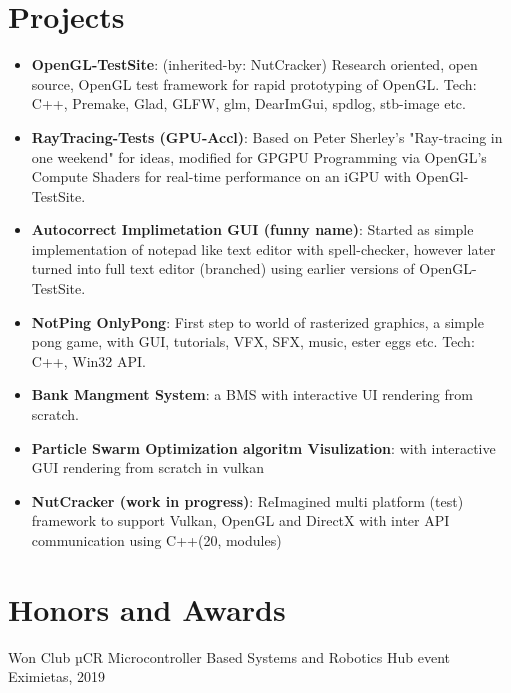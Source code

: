 \documentclass[a4paper,10pt]{article}
\newcommand{\resumeItem}[2]{
  \item\small{
    \textbf{#1}{: #2 \vspace{-2pt}}
  }
}
\newcommand{\resumeSubItem}[2]{\resumeItem{#1}{#2}\vspace{-3pt}}
\newcommand{\resumeSubHeadingListStart}{\begin{itemize}[leftmargin=*]}
\newcommand{\resumeSubHeadingListEnd}{\end{itemize}}
\begin{document}
\section{Projects}
  \resumeSubHeadingListStart
    \resumeSubItem{OpenGL-TestSite}{(inherited-by: NutCracker) Research oriented, open source, OpenGL test framework for rapid prototyping of OpenGL. Tech: C++, Premake, Glad, GLFW, glm, DearImGui, spdlog, stb-image etc. }\hspace{26pt}{(May-Oct '21)}
    \vspace{1pt}
    \resumeSubItem{RayTracing-Tests (GPU-Accl)}{Based on Peter Sherley’s "Ray-tracing in one weekend" for ideas, modified for GPGPU Programming via OpenGL's Compute Shaders for real-time performance on an iGPU with OpenGl-TestSite.}\hspace{5pt}{(Jun-Aug '21)}
    \vspace{1pt}
    \resumeSubItem{Autocorrect Implimetation GUI (funny name)}{Started as simple implementation of notepad like text editor with spell-checker, however later turned into full text editor (branched) using earlier versions of OpenGL-TestSite.}{(May-Aug '21)}
    \vspace{1pt}
    \resumeSubItem{NotPing OnlyPong}{First step to world of rasterized graphics, a simple pong game, with GUI, tutorials, VFX, SFX, music, ester eggs etc. Tech: C++, Win32 API.}\hspace{302pt}{(May '20)}
    \vspace{1pt}
    \resumeSubItem{Bank Mangment System}{a BMS with interactive UI rendering from scratch.}\hspace{134pt}{(May '20)}
    \vspace{1pt}
    \resumeSubItem{Particle Swarm Optimization algoritm Visulization}{with interactive GUI rendering from scratch in vulkan}\hspace{5pt}{(May '22)}
    \vspace{1pt}
    \resumeSubItem{NutCracker (work in progress)}{ReImagined multi platform (test) framework to support Vulkan, OpenGL and DirectX with inter API communication using C++(20, modules) }\hspace{200pt}{(May-present '22)}
  \resumeSubHeadingListEnd
\vspace{-5pt}
\section{Honors and Awards}
\begin{description}[font=$\bullet$]
\item {Won Club µCR Microcontroller Based Systems and Robotics Hub event Eximietas, 2019 }
\end{description}
\vspace{-6pt}
\end{document}
